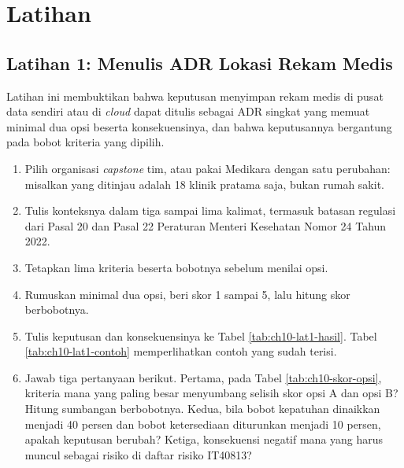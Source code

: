 \section{Latihan}

\subsection*{Latihan 1: Menulis ADR Lokasi Rekam Medis}

Latihan ini membuktikan bahwa keputusan menyimpan rekam medis di pusat data
sendiri atau di \textit{cloud} dapat ditulis sebagai ADR singkat yang memuat
minimal dua opsi beserta konsekuensinya, dan bahwa keputusannya bergantung
pada bobot kriteria yang dipilih.

\begin{enumerate}
  \item Pilih organisasi \textit{capstone} tim, atau pakai Medikara dengan
        satu perubahan: misalkan yang ditinjau adalah 18 klinik pratama saja,
        bukan rumah sakit.
  \item Tulis konteksnya dalam tiga sampai lima kalimat, termasuk batasan
        regulasi dari Pasal 20 dan Pasal 22 Peraturan Menteri Kesehatan Nomor
        24 Tahun 2022.
  \item Tetapkan lima kriteria beserta bobotnya sebelum menilai opsi.
  \item Rumuskan minimal dua opsi, beri skor 1 sampai 5, lalu hitung skor
        berbobotnya.
  \item Tulis keputusan dan konsekuensinya ke Tabel
        \ref{tab:ch10-lat1-hasil}. Tabel \ref{tab:ch10-lat1-contoh}
        memperlihatkan contoh yang sudah terisi.
  \item Jawab tiga pertanyaan berikut. Pertama, pada Tabel
        \ref{tab:ch10-skor-opsi}, kriteria mana yang paling besar
        menyumbang selisih skor opsi A dan opsi B? Hitung sumbangan
        berbobotnya. Kedua, bila bobot kepatuhan dinaikkan menjadi 40 persen
        dan bobot ketersediaan diturunkan menjadi 10 persen, apakah keputusan
        berubah? Ketiga, konsekuensi negatif mana yang harus muncul sebagai
        risiko di daftar risiko IT40813?
\end{enumerate}

